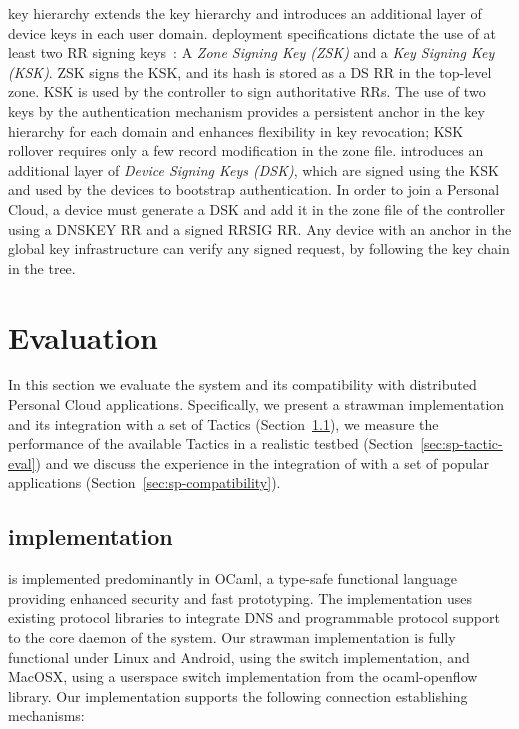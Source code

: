 \signpost key hierarchy extends the \dnssec key hierarchy and introduces an
additional layer of device keys in each user domain. \dnssec deployment
specifications dictate the use of at least two RR signing keys~: A
\textit{Zone Signing Key (ZSK)} and a \textit{Key Signing Key (KSK)}.  ZSK signs
the KSK, and its hash is stored as a DS RR in the top-level zone.
KSK is used by the controller to sign authoritative RRs\@.  The
use of two keys by the authentication mechanism provides a
persistent anchor in the \dnssec key hierarchy for each domain and enhances
flexibility in key revocation; KSK rollover requires only a few record
modification in the zone file.  \signpost introduces an additional layer
of \textit{Device Signing Keys (DSK)}, which are signed using the KSK and used
by the devices to bootstrap authentication.  In order to join a Personal Cloud,
a device must generate a DSK and add it in the zone file of the \signpost controller
using a DNSKEY
RR and a signed RRSIG RR. Any device with an anchor in the global \dnssec key
infrastructure can verify any \signpost signed request, by following the key
chain in the \dnssec tree.

\section{Evaluation}\label{sec:signpost-evaluation}

In this section we evaluate the \signpost system and its compatibility with
distributed Personal Cloud applications.  Specifically, we
present a strawman \signpost implementation and its integration with a set of
Tactics (Section~\ref{sec:sp-implementation}), we measure the performance of the
available \signpost Tactics in a realistic testbed
(Section~\ref{sec:sp-tactic-eval}) and we discuss the experience in the
integration of \signpost with a set of popular applications
(Section~\ref{sec:sp-compatibility}). 

\subsection{\signpost implementation} \label{sec:sp-implementation}

\signpost is implemented predominantly in OCaml, a type-safe functional language
providing enhanced security and fast prototyping.  The implementation uses
existing protocol libraries to integrate DNS and \of programmable protocol
support to the core daemon of the system.  Our strawman implementation is fully
functional under Linux and Android, using the \ovs switch implementation, and
MacOSX, using a userspace switch implementation from the ocaml-openflow library.
Our \signpost implementation supports  the following connection establishing
mechanisms: 

